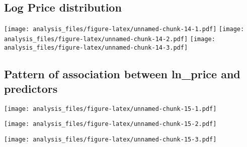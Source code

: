 \documentclass[
]{article}
\newenvironment{Shaded}{\begin{snugshade}}{\end{snugshade}}
\newcommand{\KeywordTok}[1]{\textcolor[rgb]{0.13,0.29,0.53}{\textbf{#1}}}
\newcommand{\NormalTok}[1]{#1}
\newcommand{\OperatorTok}[1]{\textcolor[rgb]{0.81,0.36,0.00}{\textbf{#1}}}
\begin{document}
\hypertarget{log-price-distribution}{%
\subsection{Log Price distribution}\label{log-price-distribution}}

\texttt{[image: analysis\_files/figure-latex/unnamed-chunk-14-1.pdf]}
\texttt{[image: analysis\_files/figure-latex/unnamed-chunk-14-2.pdf]}
\texttt{[image: analysis\_files/figure-latex/unnamed-chunk-14-3.pdf]}

\hypertarget{pattern-of-association-between-ln_price-and-predictors}{%
\subsection{Pattern of association between ln\_price and
predictors}\label{pattern-of-association-between-ln_price-and-predictors}}

\begin{Shaded}
\end{Shaded}

\texttt{[image: analysis\_files/figure-latex/unnamed-chunk-15-1.pdf]}

\begin{Shaded}
\end{Shaded}

\texttt{[image: analysis\_files/figure-latex/unnamed-chunk-15-2.pdf]}

\begin{Shaded}
\end{Shaded}

\texttt{[image: analysis\_files/figure-latex/unnamed-chunk-15-3.pdf]}

\begin{Shaded}
\end{Shaded}
\end{document}

